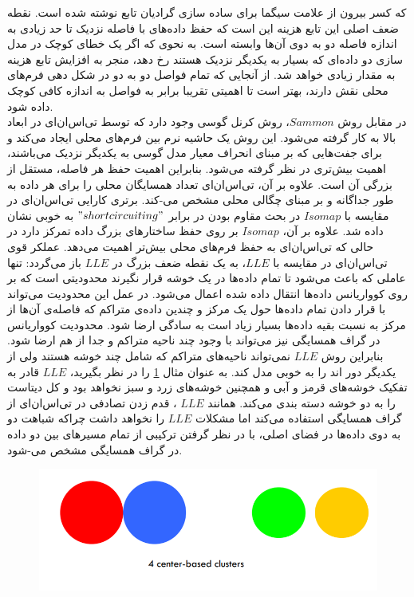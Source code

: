 که کسر بیرون از علامت سیگما برای ساده سازی گرادیان تابع نوشته شده است. نقطه ضعف اصلی این تابع هزینه این است که حفظ داده‌های با فاصله نزدیک تا حد زیادی به اندازه فاصله دو به دوی آن‌ها وابسته است. به نحوی که اگر یک خطای کوچک در مدل سازی دو داده‌ای که بسیار به یکدیگر نزدیک هستند رخ دهد، منجر به افزایش تابع هزینه به مقدار زیادی خواهد شد. از آنجایی که تمام فواصل دو به دو در شکل دهی فرم‌های محلی نقش دارند، بهتر است تا اهمیتی تقریبا برابر به فواصل به اندازه کافی کوچک داده شود. 
\\
در مقابل روش $Sammon$، روش کرنل گوسی   وجود دارد که توسط تی‌اس‌ان‌ای در ابعاد بالا به کار گرفته می‌شود. این روش یک حاشیه نرم بین فرم‌های محلی ایجاد می‌کند و برای جفت‌هایی که بر مبنای انحراف معیار مدل گوسی به یکدیگر نزدیک می‌باشند، اهمیت بیش‌تری در نظر گرفته می‌‌شود. بنابراین اهمیت حفظ هر فاصله، مستقل از بزرگی آن است. علاوه بر آن، تی‌اس‌ان‌ای تعداد همسایگان محلی را برای هر داده به طور جداگانه و بر مبنای چگالی محلی مشخص می-کند.
برتری کارایی تی‌اس‌ان‌ای در مقایسه با $Isomap$ در بحث مقاوم بودن در برابر             $"short circuiting"$ به خوبی نشان داده شد. علاوه بر آن، $Isomap$ بر روی حفظ ساختارهای بزرگ داده تمرکز دارد در حالی که تی‌اس‌ان‌ای به حفظ فرم‌های محلی بیش‌تر اهمیت می‌دهد.
عملکر قوی تی‌اس‌ان‌ای در مقایسه با $LLE$، به یک نقطه ضعف بزرگ در $LLE$ باز می‌گردد: تنها عاملی که باعث می‌شود تا تمام داده‌ها در یک خوشه قرار نگیرند محدودیتی است که بر روی کوواریانس داده‌ها انتقال داده شده اعمال می‌شود. در عمل این محدودیت می‌تواند با قرار دادن تمام داده‌ها حول یک مرکز و چندین داده‌ی متراکم که فاصله‌ی آن‌ها از مرکز به نسبت بقیه داده‌ها بسیار زیاد است به سادگی ارضا شود. محدودیت کوواریانس در گراف همسایگی نیز می‌تواند با وجود چند ناحیه متراکم و جدا از هم ارضا شود. بنابراین روش $LLE$ نمی‌تواند ناحیه‌های متراکم که شامل چند خوشه هستند ولی از یکدیگر دور اند را به خوبی مدل کند. به عنوان مثال  \cref{chapfig1} را در نظر بگیرید، $LLE$ قادر به تفکیک خوشه‌های قرمز و آبی و همچنین خوشه‌های زرد و سبز نخواهد بود و کل دیتاست را به دو خوشه دسته بندی می‌کند. 
همانند $LLE$ ، قدم زدن تصادفی در تی‌اس‌ان‌ای از گراف همسایگی استفاده می‌کند اما مشکلات $LLE$ را نخواهد داشت چراکه شباهت دو به دوی داده‌ها در فضای اصلی، با در نظر گرفتن ترکیبی از تمام مسیرهای بین دو داده در گراف همسایگی مشخص می-شود.


\begin{figure}
	\centering\includegraphics[scale=.6]{chapfig1.PNG}
	\caption{ }\label{chapfig1}
\end{figure}

